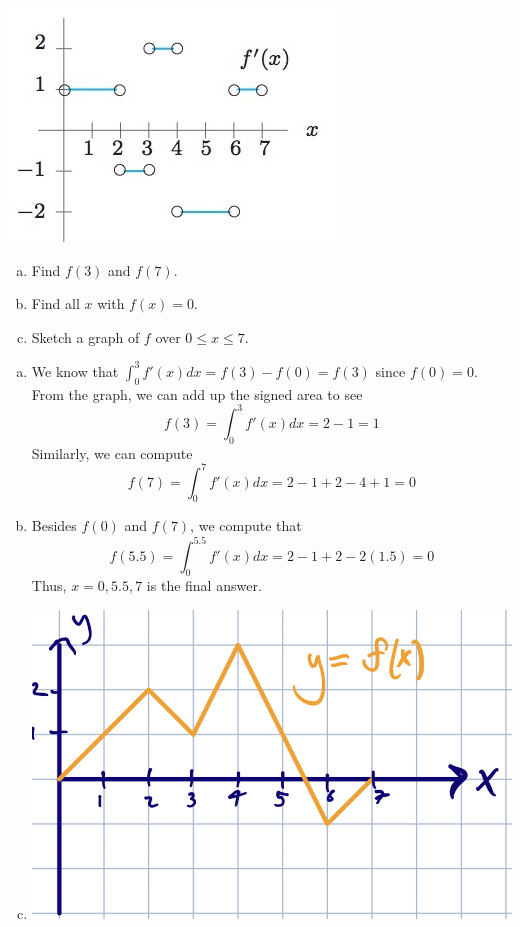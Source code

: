 \documentclass[11pt]{exam}
\begin{document}
\begin{questions}
  \begin{minipage}{0.5\linewidth}
    \includegraphics[scale=0.4]{no33}
  \end{minipage}
  \begin{minipage}{0.5\linewidth}
    \begin{enumerate}[(a)]
    \item Find \(f(3)\) and \(f(7)\).
    \item Find all \(x\) with \(f(x) = 0\).
    \item Sketch a graph of \(f\) over \(0 \leq x \leq 7\).
    \end{enumerate}
  \end{minipage}
  \begin{solution}
    \begin{enumerate}[(a)]
    \item We know that \(\int_0^3 f'(x) dx = f(3)-f(0) = f(3)\) since
      \(f(0) = 0\). From the graph, we can add up the signed area to
      see \[
        f(3) = \int_0^3 f'(x) dx = 2-1 = 1
      \]
      Similarly, we can compute \[
        f(7) = \int_0^7 f'(x) dx = 2-1+2-4+1 = 0
      \]
    \item Besides \(f(0)\) and \(f(7)\), we compute that \[
        f(5.5) = \int_0^{5.5} f'(x) dx = 2-1+2-2(1.5) = 0
      \]
      Thus, \(x=0,5.5,7\) is the final answer.
    \item \includegraphics[scale=0.5]{3c}
    \end{enumerate}
  \end{solution}
\question \,


\end{questions}
\end{document}

